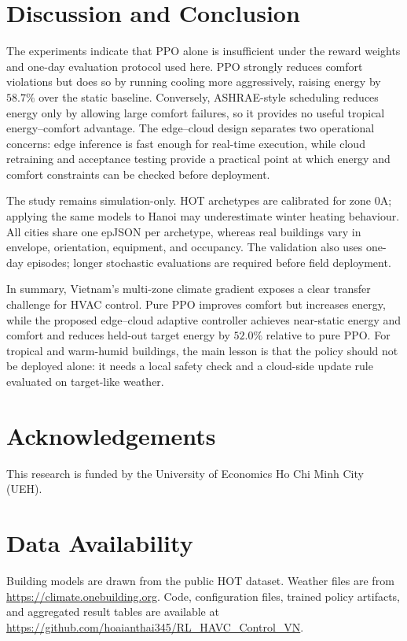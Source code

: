 \documentclass[runningheads,a4paper]{llncs}
\begin{document}
\section{Discussion and Conclusion}
The experiments indicate that PPO alone is insufficient under the reward weights and one-day evaluation protocol used here. PPO strongly reduces comfort violations but does so by running cooling more aggressively, raising energy by $58.7\%$ over the static baseline. Conversely, ASHRAE-style scheduling reduces energy only by allowing large comfort failures, so it provides no useful tropical energy--comfort advantage. The edge--cloud design separates two operational concerns: edge inference is fast enough for real-time execution, while cloud retraining and acceptance testing provide a practical point at which energy and comfort constraints can be checked before deployment.

The study remains simulation-only. HOT archetypes are calibrated for zone 0A; applying the same models to Hanoi may underestimate winter heating behaviour. All cities share one epJSON per archetype, whereas real buildings vary in envelope, orientation, equipment, and occupancy. The validation also uses one-day episodes; longer stochastic evaluations are required before field deployment.

In summary, Vietnam's multi-zone climate gradient exposes a clear transfer challenge for HVAC control. Pure PPO improves comfort but increases energy, while the proposed edge--cloud adaptive controller achieves near-static energy and comfort and reduces held-out target energy by $52.0\%$ relative to pure PPO. For tropical and warm-humid buildings, the main lesson is that the policy should not be deployed alone: it needs a local safety check and a cloud-side update rule evaluated on target-like weather.

\section*{Acknowledgements}
This research is funded by the University of Economics Ho Chi Minh City (UEH).

\section*{Data Availability}
Building models are drawn from the public HOT dataset\cite{berkes2025hot}. Weather files are from \url{https://climate.onebuilding.org}\cite{doe2024epw}. Code, configuration files, trained policy artifacts, and aggregated result tables are available at \url{https://github.com/hoaianthai345/RL_HAVC_Control_VN}.



\end{document}
